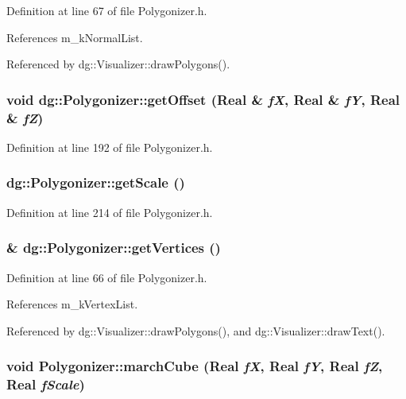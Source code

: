 Definition at line 67 of file Polygonizer.h.

References m\_\-k\-Normal\-List.

Referenced by dg::Visualizer::draw\-Polygons().
\subsubsection{\setlength{\rightskip}{0pt plus 5cm}void dg::Polygonizer::get\-Offset ({\bf Real} \& {\em f\-X}, {\bf Real} \& {\em f\-Y}, {\bf Real} \& {\em f\-Z})\hspace{0.3cm}{\tt  [inline]}}\label{classdg_1_1Polygonizer_a10}




Definition at line 192 of file Polygonizer.h.
\subsubsection{ dg::Polygonizer::get\-Scale ()\hspace{0.3cm}{\tt  [inline]}}\label{classdg_1_1Polygonizer_a12}




Definition at line 214 of file Polygonizer.h.
\subsubsection{\& dg::Polygonizer::get\-Vertices ()\hspace{0.3cm}{\tt  [inline]}}\label{classdg_1_1Polygonizer_a15}




Definition at line 66 of file Polygonizer.h.

References m\_\-k\-Vertex\-List.

Referenced by dg::Visualizer::draw\-Polygons(), and dg::Visualizer::draw\-Text().
\subsubsection{\setlength{\rightskip}{0pt plus 5cm}void Polygonizer::march\-Cube ({\bf Real} {\em f\-X}, {\bf Real} {\em f\-Y}, {\bf Real} {\em f\-Z}, {\bf Real} {\em f\-Scale})}\label{classdg_1_1Polygonizer_a21}





